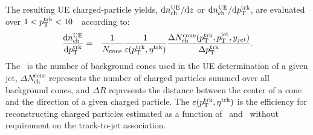 The resulting UE charged-particle yields,  $\mathrm{d} \mbox{$n_{\mathrm{ch}}^{\mathrm{UE}}$}/ \mathrm{d} \mbox{$z$}$ or $\mathrm{d} \mbox{$n_{\mathrm{ch}}^{\mathrm{UE}}$}/ \mathrm{d} \mbox{$p_{\mathrm{T}}^{\mathrm{trk}}$}$, are evaluated over $1 < \mbox{$p_{\mathrm{T}}^{\mathrm{trk}}$} < 10$~\GeV\ according to:
	\begin{eqnarray}
	\label{eq:background1}
	\dfrac{\fd \nchUE}{ \fd \pttrk} &=&
	\dfrac{1}{\Ncone}
        \dfrac{1}{\varepsilon(\pttrk,\etatrk)}
        \dfrac{\Delta N_{\mathrm{ch}}^{\mathrm{cone}}(\pttrk,\ptjet,
	  \yjet)}{\Delta \pttrk}.
	\end{eqnarray}
The \Ncone\ is the number of background cones used in the UE determination of a given jet, $\Delta N_{\mathrm{ch}}^{\mathrm{cone}}$ represents the number of charged particles summed over all background cones, and $\Delta R$ represents the distance between the center of a cone and the direction of a given charged particle. The $\varepsilon(\pttrk,\etatrk)$ is the efficiency for reconstructing charged particles estimated as a function of \pttrk\ and \etatrk\ without requirement on the track-to-jet association.

